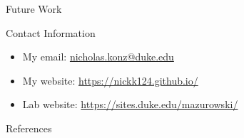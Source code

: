 \documentclass[final,hyperref={pdfpagelabels=false}]{beamer}
\begin{document}
\begin{frame}[t]
\begin{columns}[t]
\begin{column}{.47\textwidth}
\begin{block}{Future Work}
\end{block}

\begin{block}{Contact Information}
\begin{itemize}
\item My email: \href{mailto:nicholas.konz@duke.edu}{nicholas.konz@duke.edu}
\item My website: \url{https://nickk124.github.io/}
\item Lab website: \url{https://sites.duke.edu/mazurowski/}
\end{itemize}
\end{block}
\begin{block}{References}
        
\small{
}

\end{block}

\end{column} %

\begin{column}{.02\textwidth}\end{column} %
 
\end{columns} %

\end{frame} %
\end{document}

